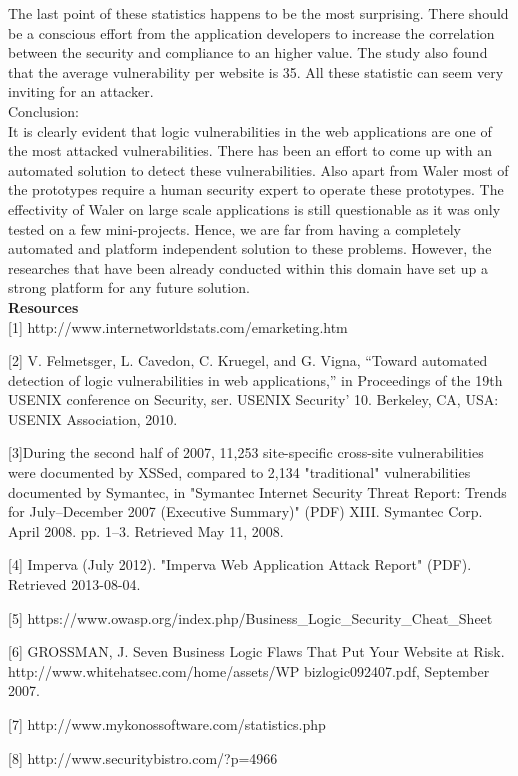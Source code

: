 \documentclass[11pt]{article}
\begin{document}
The last point of these statistics happens to be the most surprising. There should be a conscious effort from the application developers to increase the correlation between the security and compliance to an higher value. The study also found that the average vulnerability per website is 35. All these statistic can seem very inviting for an attacker. \\
Conclusion:\\
It is clearly evident that logic vulnerabilities in the web applications are one of the most attacked vulnerabilities. There has been an effort to come up with an automated solution to detect these vulnerabilities. Also apart from Waler most of the prototypes require a human security expert to operate these prototypes. The effectivity of Waler on large scale applications is still questionable as it was only tested on a few mini-projects. Hence, we are far from having a completely automated and platform independent solution to these problems. However, the researches that have been already conducted within this domain have set up a strong platform for any future solution.\\
\textbf{Resources}\\

[1] http://www.internetworldstats.com/emarketing.htm

[2] V. Felmetsger, L. Cavedon, C. Kruegel, and G. Vigna, “Toward automated detection of logic vulnerabilities in web applications,” in Proceedings of the 19th USENIX conference on Security, ser. USENIX Security’ 10. Berkeley, CA, USA: USENIX Association, 2010.

[3]During the second half of 2007, 11,253 site-specific cross-site vulnerabilities were documented by XSSed, compared to 2,134 "traditional" vulnerabilities documented by Symantec, in "Symantec Internet Security Threat Report: Trends for July–December 2007 (Executive Summary)" (PDF) XIII. Symantec Corp. April 2008. pp. 1–3. Retrieved May 11, 2008.

[4] Imperva (July 2012). "Imperva Web Application Attack Report" (PDF). Retrieved 2013-08-04. 

[5] https://www.owasp.org/index.php/Business_Logic_Security_Cheat_Sheet

[6] GROSSMAN, J. Seven Business Logic Flaws That Put Your Website at Risk. http://www.whitehatsec.com/home/assets/WP bizlogic092407.pdf, September 2007.

[7] http://www.mykonossoftware.com/statistics.php

[8] http://www.securitybistro.com/?p=4966
\end{document}
